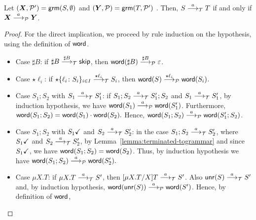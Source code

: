 \newcommand{\grmcontext}{
  $(\vec X, \productions') = \grm(S, \emptyset)$ and 
  $(\vec Y, \productions) = \grm(T, \productions')$%
}

\begin{lemma}
  \label{lem:transitions_mimic}
  Let \grmcontext. Then, 
  $S \LTSderives T$ if and only if $\vec X \LTSderivesP \vec Y$.
\end{lemma}
%
\begin{proof}
	For the direct implication, we proceed by rule induction on the
	hypothesis, using the definition of $\word$.
	
	\begin{itemize}
		\item Case $\sharp B$: if $\sharp B \LTSderives[\sharp B] \skipk$, then 
			$\word(\sharp B) \LTSderivesP[\sharp B] \varepsilon$.
		\item Case $\star \ell_i$: if
		$\star\{\ell_i\colon S_i\}_{i\in I} \LTSderives[\star \ell_i] S_i$, then
		$\word(S) \LTSderivesP[\star \ell_i] \word(S_i)$.
		\item Case $S_1;S_2$ with $S_1\LTSderives S_1'$:
		if $S_1;S_2\LTSderives S_1';S_2$ and $S_1\LTSderives S_1'$,
			by induction hypothesis, we have $\word(S_1) \LTSderivesP \word(S_1')$.
			Furthermore, 
				$\word(S_1;S_2) = \word(S_1)\cdot\word(S_2).	$
			Hence, $\word(S_1;S_2) \LTSderivesP \word(S_1';S_2)$.
		\item Case $S_1;S_2$ with $\DONE{S_1}$ and $S_2\LTSderives S_2'$: 
			in the case $S_1;S_2\LTSderives S_2'$, where
			$\DONE{S_1}$ and $S_2\LTSderives S_2'$, 
			by %
			Lemma~\ref{lemma:terminated-togrammar} and since $\DONE{S_1}$, 
			we have $\word(S_1;S_2) = \word(S_2)$.
			Thus, by induction hypothesis we have 
			$\word(S_1;S_2) \LTSderivesP \word(S_2').$
		\item Case $\mu X.T$: if $\mu X.T\LTSderives S'$, 
			then $\subs {\mu X. T}{X}{T} \LTSderives S'$. Also
			$\Unravel(S) \LTSderives S'$ and, by induction hypothesis,
			$\word(\Unravel(S))\LTSderivesP \word(S')$. Hence, by 
			definition of $\word$, 

\end{itemize}
\end{proof}
